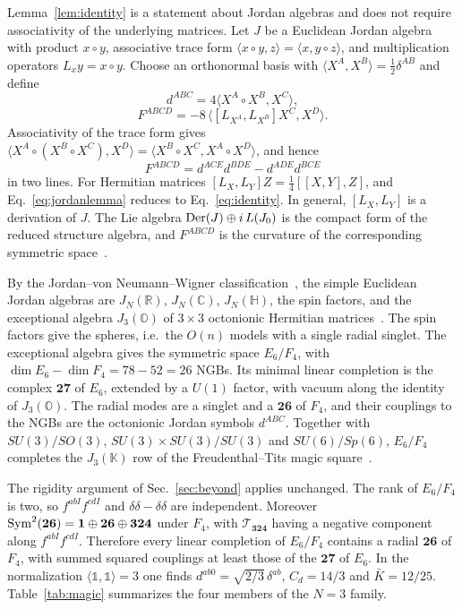Lemma~\ref{lem:identity} is a statement about Jordan algebras and does not require associativity of the underlying matrices. Let $J$ be a Euclidean Jordan algebra with product $x\circ y$, associative trace form $\langle x\circ y,z\rangle=\langle x,y\circ z\rangle$, and multiplication operators $L_x y=x\circ y$. Choose an orthonormal basis with $\langle X^A,X^B\rangle=\frac12\delta^{AB}$ and define
\[
d^{ABC}=4\langle X^A\circ X^B,X^C\rangle,
\]
\[
F^{ABCD}=-8\,\big\langle[L_{X^A},L_{X^B}]X^C,X^D\big\rangle .
\]
Associativity of the trace form gives $\langle X^A\circ(X^B\circ X^C),X^D\rangle=\langle X^B\circ X^C,X^A\circ X^D\rangle$, and hence
\begin{equation}
F^{ABCD}=d^{ACE}d^{BDE}-d^{ADE}d^{BCE}
\label{eq:jordanlemma}
\end{equation}
in two lines. For Hermitian matrices $[L_X,L_Y]Z=\frac14[[X,Y],Z]$, and Eq.~\eqref{eq:jordanlemma} reduces to Eq.~\eqref{eq:identity}. In general, $[L_X,L_Y]$ is a derivation of $J$. The Lie algebra ${\rm Der}(J)\oplus i\,L(J_0)$ is the compact form of the reduced structure algebra, and $F^{ABCD}$ is the curvature of the corresponding symmetric space~\cite{FarautKoranyi}.

By the Jordan--von Neumann--Wigner classification~\cite{Jordan:1933vh}, the simple Euclidean Jordan algebras are $J_N(\mathbb R)$, $J_N(\mathbb C)$, $J_N(\mathbb{H})$, the spin factors, and the exceptional algebra $J_3(\mathbb O)$ of $3\times3$ octonionic Hermitian matrices~\cite{Baez:2001dm}. The spin factors give the spheres, i.e.\ the $O(n)$ models with a single radial singlet. The exceptional algebra gives the symmetric space $E_6/F_4$, with $\dim E_6-\dim F_4=78-52=26$ NGBs. Its minimal linear completion is the complex $\mathbf{27}$ of $E_6$, extended by a $U(1)$ factor, with vacuum along the identity of $J_3(\mathbb O)$. The radial modes are a singlet and a $\mathbf{26}$ of $F_4$, and their couplings to the NGBs are the octonionic Jordan symbols $d^{ABC}$. Together with $SU(3)/SO(3)$, $SU(3)\times SU(3)/SU(3)$ and $SU(6)/Sp(6)$, $E_6/F_4$ completes the $J_3(\mathbb K)$ row of the Freudenthal--Tits magic square~\cite{Freudenthal:1964,Tits:1966,GurseyTze}.

The rigidity argument of Sec.~\ref{sec:beyond} applies unchanged. The rank of $E_6/F_4$ is two, so $f^{abI}f^{cdI}$ and $\delta\delta-\delta\delta$ are independent. Moreover ${\rm Sym}^2(\mathbf{26})=\mathbf1\oplus\mathbf{26}\oplus\mathbf{324}$ under $F_4$, with $\mathcal T_{\mathbf{324}}$ having a negative component along $f^{abI}f^{cdI}$. Therefore every linear completion of $E_6/F_4$ contains a radial $\mathbf{26}$ of $F_4$, with summed squared couplings at least those of the $\mathbf{27}$ of $E_6$. In the normalization $\langle\mathbb{1},\mathbb{1}\rangle=3$ one finds $d^{ab0}=\sqrt{2/3}\,\delta^{ab}$, $C_d=14/3$ and $\bar K=12/25$. Table~\ref{tab:magic} summarizes the four members of the $N=3$ family.

